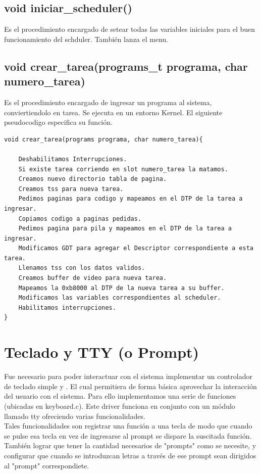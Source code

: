 \documentclass[a4paper,10pt]{article}
\begin{document}
\subsection*{void iniciar\_scheduler()}
Es el procedimiento encargado de setear todas las variables iniciales para el buen funcionamiento del schduler. También lanza el menu.

\subsection*{void crear\_tarea(programs\_t programa, char numero\_tarea)}
Es el procedimiento encargado de ingresar un programa al sistema, conviertiendolo en tarea. Se ejecuta en un entorno Kernel.
El siguiente pseudocodigo especifica su función.
\begin{verbatim}
void crear_tarea(programs programa, char numero_tarea){
    
    Deshabilitamos Interrupciones.
    Si existe tarea corriendo en slot numero_tarea la matamos.
    Creamos nuevo directorio tabla de pagina.
    Creamos tss para nueva tarea.
    Pedimos paginas para codigo y mapeamos en el DTP de la tarea a ingresar.
    Copiamos codigo a paginas pedidas.
    Pedimos pagina para pila y mapeamos en el DTP de la tarea a ingresar.
    Modificamos GDT para agregar el Descriptor correspondiente a esta tarea.
    Llenamos tss con los datos validos.
    Creamos buffer de video para nueva tarea.
    Mapeamos la 0xb8000 al DTP de la nueva tarea a su buffer.
    Modificamos las variables correspondientes al scheduler.
    Habilitamos interrupciones.
}
\end{verbatim}
\newpage
\section{Teclado y TTY (o Prompt)}
Fue necesario para poder interactuar con el sistema implementar un controlador de teclado simple y . El cual permitiera de forma básica aprovechar la interacción del usuario con el sistema. Para ello implementamos una serie de funciones (ubicadas en keyboard.c). Este driver funciona en conjunto con un módulo llamado tty ofreciendo varias funcionalidades.\\
Tales funcionalidades son registrar una función a una tecla de modo que cuando se pulse esa tecla en vez de ingresarse al prompt se dispare la suscitada función. También lograr que tener la cantidad necesarios de "prompts" como se necesite, y configurar que cuando se introduzcan letras a través de ese prompt sean dirigidos al "prompt" correspondiete.
\end{document}
